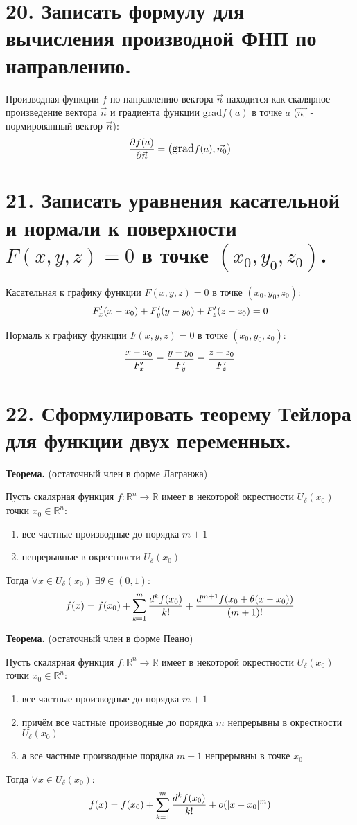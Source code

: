 \documentclass[11pt]{article}
\begin{document}
\section*{20. Записать формулу для вычисления производной ФНП по направлению.}
\par Производная функции $f$ по направлению вектора $\vec{n}$ находится как скалярное произведение вектора $\vec{n}$ и градиента функции $\text{grad} f(a)$ в точке $a$ ($\vec{n_{0}}$ - нормированный вектор $\vec{n}$):
$$\large\frac{\partial f(a)}{\partial \vec{n}} = \left( \text{grad}f(a), \vec{n_{0}} \right)$$
\section*{21. Записать уравнения касательной и нормали к поверхности $F(x, y, z) = 0$ в точке $(x_0, y_0, z_0)$.}
\par Касательная к графику функции $F(x, y, z) = 0$ в точке $(x_{0}, y_{0}, z_{0})$:
$$\large F'_{x}(x - x_{0}) + F'_{y}(y - y_{0}) + F'_{z}(z - z_{0}) = 0$$
\par Нормаль к графику функции $F(x, y, z) = 0$ в точке $(x_{0}, y_{0}, z_{0})$:
$$\large\frac{x - x_{0}}{F'_{x}} = \frac{y - y_{0}}{F'_{y}} = \frac{z - z_{0}}{F'_{z}}$$
\section*{22. Сформулировать теорему Тейлора для функции двух переменных.}
\par\textbf{Теорема.} (остаточный член в форме Лагранжа)
\par Пусть скалярная функция $f: \mathbb{R}^{n} \to \mathbb{R}$ имеет в некоторой окрестности $U_{\delta}(x_{0})$ точки $x_{0} \in \mathbb{R}^n$:
\begin{enumerate}
    \item все частные производные до порядка $m + 1$
    \item непрерывные в окрестности $U_{\delta}(x_{0})$
\end{enumerate}
\par Тогда $\forall x \in U_{\delta}(x_{0}) \; \exists \theta \in (0, 1)$:$$\large f(x) = f(x_{0}) + \sum_{k=1}^m \frac{d^k f(x_{0})}{k!} + \frac{d^{m+1}f(x_{0} + \theta(x - x_{0}))}{(m+1)!}$$
\par\textbf{Теорема.} (остаточный член в форме Пеано)
\par Пусть скалярная функция $f: \mathbb{R}^{n} \to \mathbb{R}$ имеет в некоторой окрестности $U_{\delta}(x_{0})$ точки $x_{0} \in \mathbb{R}^n$:
\begin{enumerate}
    \item все частные производные до порядка $m + 1$
    \item причём все частные производные до порядка $m$ непрерывны в окрестности $U_{\delta}(x_{0})$
    \item а все частные производные порядка $m + 1$ непрерывны в точке $x_{0}$
\end{enumerate}
\par Тогда $\forall x \in U_{\delta}(x_{0})$:$$\large f(x) = f(x_{0}) + \sum_{k=1}^m \frac{d^k f(x_{0})}{k!} + o(|x - x_{0}|^m)$$
\end{document}
